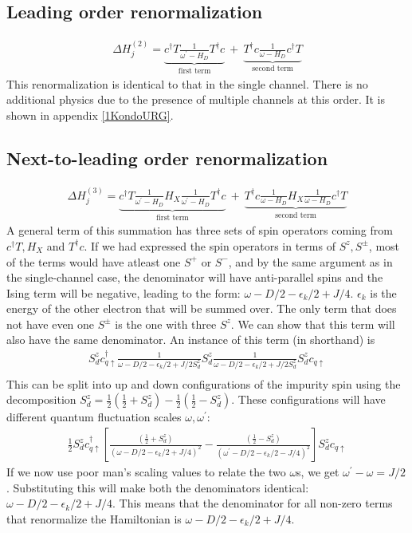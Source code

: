 \documentclass[12pt]{revtex4-2}
\begin{document}
\subsection{Leading order renormalization}
\begin{align}
	\Delta H^{(2)}_j = \underbrace{c^\dagger T \frac{1}{\omega^\prime - H_D}T^\dagger c}_\text{first term}~+~\underbrace{T^\dagger c \frac{1}{\omega - H_D}c^\dagger T}_\text{second term}
\end{align}
This renormalization is identical to that in the single channel. There is no additional physics due to the presence of multiple channels at this order. It is shown in appendix \ref{1KondoURG}.

\subsection{Next-to-leading order renormalization}
\begin{align}
	\Delta H^{(3)}_j = \underbrace{c^\dagger T \frac{1}{\omega^\prime - H_D} H_X \frac{1}{\omega^\prime - H_D} T^\dagger c}_\text{first term} ~+~ \underbrace{T^\dagger c \frac{1}{\omega - H_D} H_X \frac{1}{\omega - H_D} c^\dagger T}_\text{second term}
\end{align}
A general term of this summation has three sets of spin operators coming from \(c^\dagger T, H_X\) and \(T^\dagger c\). If we had expressed the spin operators in terms of \(S^z, S^\pm\), most of the terms would have atleast one \(S^+\) or \(S^-\), and by the same argument as in the single-channel case, the denominator will have anti-parallel spins and the Ising term will be negative, leading to the form: \(\omega - D/2 - \epsilon_k/2 + J/4\). \(\epsilon_k\) is the energy of the other electron that will be summed over. The only term that does not have even one \(S^\pm\) is the one with three \(S^z\). We can show that this term will also have the same denominator. An instance of this term (in shorthand) is
\begin{align}
	S_d^z c^\dagger_{q \uparrow} \frac{1}{\omega - D/2 -\epsilon_k/2 + J/2 S_d^z} S_d^z \frac{1}{\omega - D/2 -\epsilon_k/2 + J/2 S_d^z} S_d^z c_{q \uparrow}\\
\end{align}
This can be split into up and down configurations of the impurity spin using the decomposition \(S_d^z = \frac{1}{2}\left(\frac{1}{2} + S_d^z\right) - \frac{1}{2}\left(\frac{1}{2} - S_d^z \right) \). These configurations will have different quantum fluctuation scales \(\omega, \omega^\prime\):
\begin{align}
	\frac{1}{2}S_d^z c^\dagger_{q \uparrow}\left[\frac{\left(\frac{1}{2} + S_d^z\right)}{\left(\omega - D/2 -\epsilon_k/2 + J/4\right)^2} - \frac{\left(\frac{1}{2} - S_d^z\right)}{\left(\omega^\prime - D/2 -\epsilon_k/2 - J/4\right)^2}\right]S_d^z c_{q \uparrow}
\end{align}
If we now use poor man's scaling values to relate the two \(\omega\)s, we get \(\omega^\prime - \omega = J/2\). Substituting this will make both the denominators identical: \(\omega - D/2 -\epsilon_k/2 + J/4\). This means that the denominator for all non-zero terms that renormalize the Hamiltonian is \(\omega - D/2 - \epsilon_k/2 + J/4\).
\end{document}
